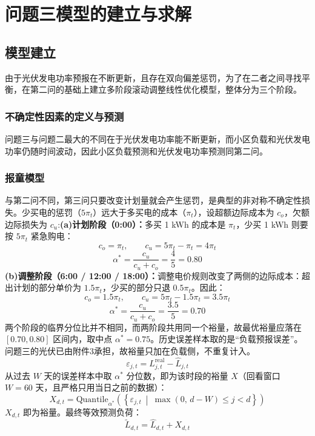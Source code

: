 \documentclass{cumcmthesis}
\begin{document}
\section{问题三模型的建立与求解}
        \subsection{模型建立}
        由于光伏发电功率预报在不断更新，且存在双向偏差惩罚，为了在二者之间寻找平衡，在第二问的基础上建立多阶段滚动调整线性优化模型，整体分为三个阶段。
       \subsubsection{不确定性因素的定义与预测}
        问题三与问题二最大的不同在于光伏发电功率能不断更新，而小区负载和光伏发电功率仍随时间波动，因此小区负载预测和光伏发电功率预测同第二问。
        \subsubsection{报童模型}
与第二问不同，第三问只要改变计划量就会产生惩罚，是典型的非对称不确定性损失。少买电的惩罚（$5\pi_t$）远大于多买电的成本（$\pi_t$），设超额边际成本为 $c_o$，欠额边际损失为 $c_u$:\newline \hspace*{2em}\textbf{(a)计划阶段（0:00）：}多买 1 kWh 的成本是 $\pi_t$，少买 1 kWh 则要按 $5\pi_t$ 紧急购电：
\begin{equation}
c_{o} = \pi_{t},\qquad c_{u} = 5\pi_{t} - \pi_{t} = 4\pi_{t}
\end{equation}
\begin{equation}
\alpha^{*} = \frac{c_u}{c_u + c_o} = \frac{4}{5} = 0.80
\end{equation}
\newline \hspace*{2em}\textbf{(b)调整阶段（6:00 / 12:00 / 18:00）：}调整电价规则改变了两侧的边际成本：超出计划的部分单价为 $1.5\pi_t$，少买的部分只退 $0.5\pi_t$。因此：
\begin{equation}
    c_o = 1.5\pi_t,\qquad c_u = 5\pi_t - 1.5\pi_t = 3.5\pi_t
\end{equation}
\begin{equation}
    \alpha^{*} = \frac{c_u}{c_u + c_o} = \frac{3.5}{5} = 0.70
\end{equation}
两个阶段的临界分位比并不相同，而两阶段共用同一个裕量，故最优裕量应落在 $[0.70, 0.80]$ 区间内，取中点 $\alpha^*=0.75$。历史误差样本取的是“负载预报误差”。问题三的光伏已由附件3承担，故裕量只加在负载侧，不重复计入。
\begin{equation}
\varepsilon_{j,t} = L^{\mathrm{real}}_{j,t} - \hat{L}_{j,t}
\end{equation}
从过去 $W$ 天的误差样本中取 $\alpha^*$ 分位数，即为该时段的裕量 $X$（回看窗口 $W=60$ 天，且严格只用当日之前的数据）：
\begin{equation}
X_{d,t} = \mathrm{Quantile}_{\alpha^{*}}\!\left(\left\{\varepsilon_{j,t}\ \middle|\ \max(0,\,d-W) \le j < d\right\}\right)
\end{equation}
$X_{d,t}$ 即为裕量。最终等效预测负荷：
\begin{equation}
\tilde{L}_{d,t} = \hat{L}_{d,t} + X_{d,t}
\end{equation}
\end{document}
